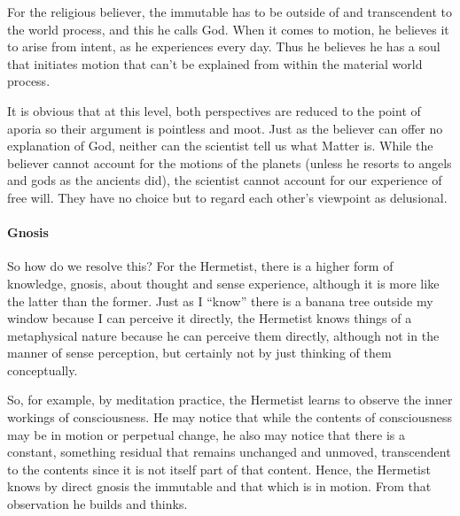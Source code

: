 For the religious believer, the immutable has to be outside of and transcendent to the world process, and this he calls God. When it comes to motion, he believes it to arise from intent, as he experiences every day. Thus he believes he has a soul that initiates motion that can't be explained from within the material world process.

It is obvious that at this level, both perspectives are reduced to the point of aporia so their argument is pointless and moot. Just as the believer can offer no explanation of God, neither can the scientist tell us what Matter is. While the believer cannot account for the motions of the planets (unless he resorts to angels and gods as the ancients did), the scientist cannot account for our experience of free will. They have no choice but to regard each other's viewpoint as delusional.

\paragraph{Gnosis}


So how do we resolve this? For the Hermetist, there is a higher form of knowledge, gnosis, about thought and sense experience, although it is more like the latter than the former. Just as I ``know'' there is a banana tree outside my window because I can perceive it directly, the Hermetist knows things of a metaphysical nature because he can perceive them directly, although not in the manner of sense perception, but certainly not by just thinking of them conceptually.

So, for example, by meditation practice, the Hermetist learns to observe the inner workings of consciousness. He may notice that while the contents of consciousness may be in motion or perpetual change, he also may notice that there is a constant, something residual that remains unchanged and unmoved, transcendent to the contents since it is not itself part of that content. Hence, the Hermetist knows by direct gnosis the immutable and that which is in motion. From that observation he builds and thinks.



